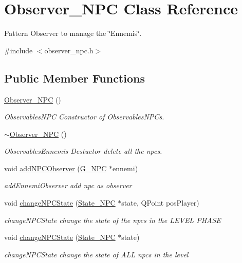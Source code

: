 \hypertarget{class_observer___n_p_c}{}\section{Observer\+\_\+\+N\+P\+C Class Reference}
\label{class_observer___n_p_c}


Pattern Observer to manage the \char`\"{}\+Ennemis\char`\"{}.  




{\ttfamily \#include $<$observer\+\_\+npc.\+h$>$}

\subsection*{Public Member Functions}
\begin{DoxyCompactItemize}
\item 
\hyperlink{class_observer___n_p_c_a02a4df6c3974a0ebae0143077fdc43b9}{Observer\+\_\+\+N\+P\+C} ()
\begin{DoxyCompactList}\small\item\em Observables\+N\+P\+C Constructor of Observables\+N\+P\+Cs. \end{DoxyCompactList}\item 
\hypertarget{class_observer___n_p_c_afa171d5bb3869a7a2a83024c9ee48c44}{}\hyperlink{class_observer___n_p_c_afa171d5bb3869a7a2a83024c9ee48c44}{$\sim$\+Observer\+\_\+\+N\+P\+C} ()\label{class_observer___n_p_c_afa171d5bb3869a7a2a83024c9ee48c44}

\begin{DoxyCompactList}\small\item\em Observables\+Ennemis Destuctor delete all the npcs. \end{DoxyCompactList}\item 
void \hyperlink{class_observer___n_p_c_a5b4f8fa343886c15bcda6c44b8367a2b}{add\+N\+P\+C\+Observer} (\hyperlink{class_g___n_p_c}{G\+\_\+\+N\+P\+C} $\ast$ennemi)
\begin{DoxyCompactList}\small\item\em add\+Ennemi\+Observer add npc as observer \end{DoxyCompactList}\item 
void \hyperlink{class_observer___n_p_c_a587198fc5427895800f74b5c4e14dcaa}{change\+N\+P\+C\+State} (\hyperlink{class_state___n_p_c}{State\+\_\+\+N\+P\+C} $\ast$state, Q\+Point pos\+Player)
\begin{DoxyCompactList}\small\item\em change\+N\+P\+C\+State change the state of the npcs in the L\+E\+V\+E\+L P\+H\+A\+S\+E \end{DoxyCompactList}\item 
void \hyperlink{class_observer___n_p_c_a69e882a059bac1e47b29ee83d177b09b}{change\+N\+P\+C\+State} (\hyperlink{class_state___n_p_c}{State\+\_\+\+N\+P\+C} $\ast$state)
\begin{DoxyCompactList}\small\item\em change\+N\+P\+C\+State change the state of A\+L\+L npcs in the level \end{DoxyCompactList}\end{DoxyCompactItemize}


